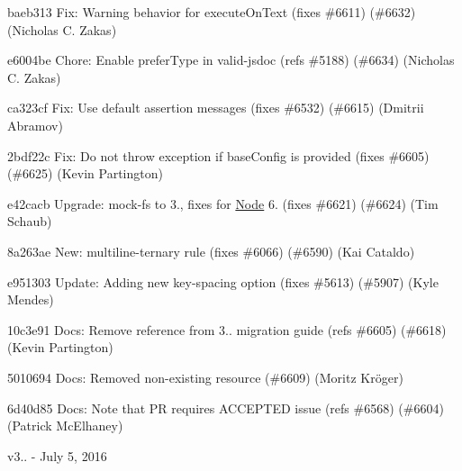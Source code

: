 \begin{DoxyItemize}
\item baeb313 Fix\+: Warning behavior for execute\+On\+Text (fixes \#6611) (\#6632) (Nicholas C. Zakas)
\item e6004be Chore\+: Enable prefer\+Type in valid-\/jsdoc (refs \#5188) (\#6634) (Nicholas C. Zakas)
\item ca323cf Fix\+: Use default assertion messages (fixes \#6532) (\#6615) (Dmitrii Abramov)
\item 2bdf22c Fix\+: Do not throw exception if base\+Config is provided (fixes \#6605) (\#6625) (Kevin Partington)
\item e42cacb Upgrade\+: mock-\/fs to 3., fixes for \mbox{\hyperlink{class_node}{Node}} 6. (fixes \#6621) (\#6624) (Tim Schaub)
\item 8a263ae New\+: multiline-\/ternary rule (fixes \#6066) (\#6590) (Kai Cataldo)
\item e951303 Update\+: Adding new {\ttfamily key-\/spacing} option (fixes \#5613) (\#5907) (Kyle Mendes)
\item 10c3e91 Docs\+: Remove reference from 3.. migration guide (refs \#6605) (\#6618) (Kevin Partington)
\item 5010694 Docs\+: Removed non-\/existing resource (\#6609) (Moritz Kröger)
\item 6d40d85 Docs\+: Note that PR requires A\+C\+C\+E\+P\+T\+ED issue (refs \#6568) (\#6604) (Patrick Mc\+Elhaney)
\end{DoxyItemize}

v3.. -\/ July 5, 2016


